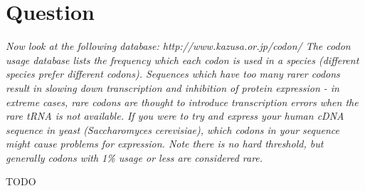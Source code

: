 \section{Question}

\textit{Now look at the following database:
http://www.kazusa.or.jp/codon/
The codon usage database lists the frequency which each codon is used in a species (different species prefer different codons). Sequences which have too many rarer codons result in slowing down transcription and inhibition of protein expression - in extreme cases, rare codons are thought to introduce transcription errors when the rare tRNA is not available. If you were to try and express your human cDNA sequence in yeast (Saccharomyces cerevisiae), which codons in your sequence might cause problems for expression. Note there is no hard threshold, but generally codons with 1\% usage or less are considered rare.}

\bigskip

TODO

\newpage
